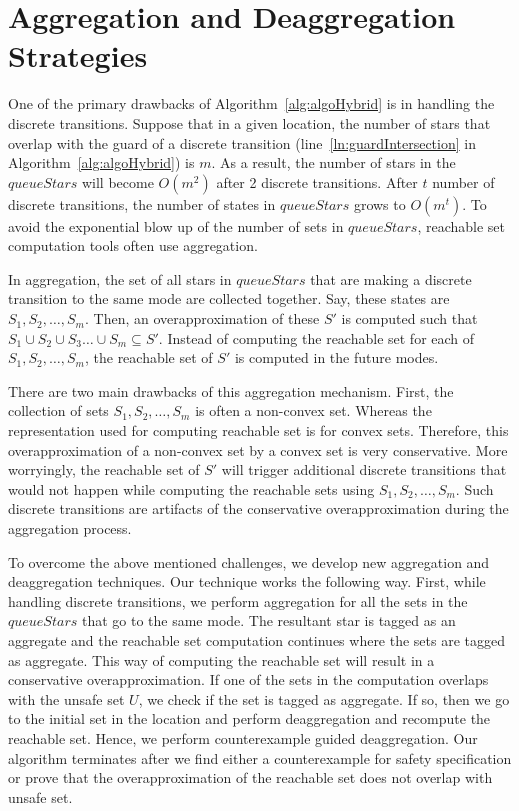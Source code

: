 \vspace{-0.4cm}
\section{Aggregation and Deaggregation Strategies}
\label{sec:agdag}
\vspace{-0.2cm}

One of the primary drawbacks of Algorithm~\ref{alg:algoHybrid} is in handling the discrete transitions. 
%
Suppose that in a given location, the number of stars that overlap with the guard of a discrete transition (line~\ref{ln:guardIntersection} in Algorithm~\ref{alg:algoHybrid}) is $m$.
%
As a result, the number of stars in the $queueStars$ will become $O(m^2)$ after 2 discrete transitions. After $t$ number of discrete transitions, the number of states in $queueStars$ grows to $O(m^t)$.
%
To avoid the exponential blow up of the number of sets in $queueStars$, reachable set computation tools often use aggregation.

In aggregation, the set of all stars in $queueStars$ that are making a discrete transition to the same mode are collected together. 
%
Say, these states are $S_1, S_2, \ldots, S_m$.
%
Then, an overapproximation of these $S'$ is computed such that $S_1 \cup S_2 \cup S_3 \ldots \cup S_m \subseteq S'$. 
%
Instead of computing the reachable set for each of $S_1, S_2, \ldots, S_m$, the reachable set of $S'$ is computed in the future modes.

There are two main drawbacks of this aggregation mechanism. 
%
First, the collection of sets $S_1, S_2, \ldots, S_m$ is often a non-convex set. 
%
Whereas the representation used for computing reachable set is for convex sets. 
%
Therefore, this overapproximation of a non-convex set by a convex set is very conservative.
%
More worryingly, the reachable set of $S'$ will trigger additional discrete transitions that would not happen while computing the reachable sets using $S_1, S_2, \ldots, S_m$.
%
Such discrete transitions are artifacts of the conservative overapproximation during the aggregation process.


To overcome the above mentioned challenges, we develop new aggregation and deaggregation techniques. Our technique works the following way. 
First, while handling discrete transitions, we perform aggregation for all the sets in the $queueStars$ that go to the same mode. 
%
The resultant star is tagged as an \textsf{aggregate} and the reachable set computation continues where the sets are tagged as \textsf{aggregate}. 
%
This way of computing the reachable set will result in a conservative overapproximation.
%
If one of the sets in the computation overlaps with the unsafe set $U$, we check if the set is tagged as \textsf{aggregate}.
%
If so, then we go to the initial set in the location and perform deaggregation and recompute the reachable set.
%
Hence, we perform counterexample guided deaggregation.
%
Our algorithm terminates after we find either a counterexample for safety specification or prove that the overapproximation of the reachable set does not overlap with unsafe set.

